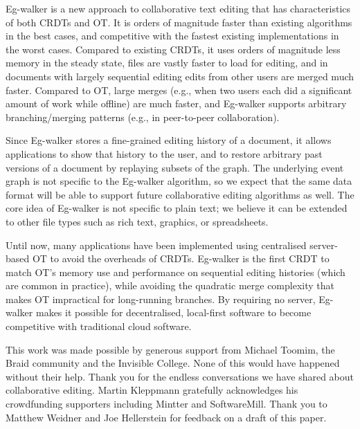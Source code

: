 \documentclass[sigplan,10pt]{acmart}
\newcommand{\algname}{Eg-walker\xspace}
\begin{document}
\algname is a new approach to collaborative text editing that has characteristics of both CRDTs and OT.
It is orders of magnitude faster than existing algorithms in the best cases, and competitive with the fastest existing implementations in the worst cases.
Compared to existing CRDTs, it uses orders of magnitude less memory in the steady state, files are vastly faster to load for editing, and in documents with largely sequential editing edits from other users are merged much faster.
Compared to OT, large merges (e.g., when two users each did a significant amount of work while offline) are much faster, and \algname supports arbitrary branching/merging patterns (e.g., in peer-to-peer collaboration).

Since \algname stores a fine-grained editing history of a document, it allows applications to show that history to the user, and to restore arbitrary past versions of a document by replaying subsets of the graph.
The underlying event graph is not specific to the \algname algorithm, so we expect that the same data format will be able to support future collaborative editing algorithms as well.
The core idea of \algname is not specific to plain text; we believe it can be extended to other file types such as rich text, graphics, or spreadsheets.

Until now, many applications have been implemented using centralised server-based OT to avoid the overheads of CRDTs.
\algname is the first CRDT to match OT's memory use and performance on sequential editing histories (which are common in practice), while avoiding the quadratic merge complexity that makes OT impractical for long-running branches.
By requiring no server, \algname makes it possible for decentralised, local-first software \cite{Kleppmann2019localfirst} to become competitive with traditional cloud software.

\begin{acks}
  This work was made possible by generous support from Michael Toomim, the Braid community and the Invisible College. None of this would have happened without their help. Thank you for the endless conversations we have shared about collaborative editing.
  Martin Kleppmann gratefully acknowledges his crowdfunding supporters including Mintter and SoftwareMill.
  Thank you to Matthew Weidner and Joe Hellerstein for feedback on a draft of this paper.
\end{acks}

\clearpage


\end{document}
